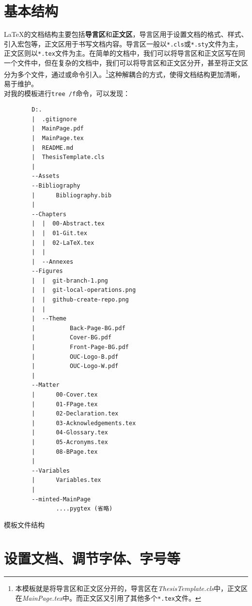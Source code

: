 \section{基本结构}

\LaTeX{}的文档结构主要包括\textbf{导言区}和\textbf{正文区}，导言区用于设置文档的格式、样式、引入宏包等，正文区用于书写文档内容。导言区一般以\texttt{*.cls}或\texttt{*.sty}文件为主，正文区则以\texttt{*.tex}文件为主。在简单的文档中，我们可以将导言区和正文区写在同一个文件中，但在复杂的文档中，我们可以将导言区和正文区分开，甚至将正文区分为多个文件，通过\verb||或\verb||命令引入。\footnote{本模板就是将导言区和正文区分开的，导言区在\textit{ThesisTemplate.cls}中，正文区在\textit{MainPage.tex}中。而正文区又引用了其他多个\texttt{*.tex}文件。}这种解耦合的方式，使得文档结构更加清晰，易于维护。\\

对我的模板进行\texttt{tree /f}命令，可以发现：

\begin{longlisting}
    \begin{verbatim}
        D:.
        |  .gitignore
        |  MainPage.pdf
        |  MainPage.tex
        |  README.md
        |  ThesisTemplate.cls
        |
        --Assets
        --Bibliography
        |      Bibliography.bib
        |
        --Chapters
        |  |  00-Abstract.tex
        |  |  01-Git.tex
        |  |  02-LaTeX.tex
        |  |
        |  --Annexes
        --Figures
        |  |  git-branch-1.png
        |  |  git-local-operations.png
        |  |  github-create-repo.png
        |  |
        |  --Theme
        |          Back-Page-BG.pdf
        |          Cover-BG.pdf
        |          Front-Page-BG.pdf
        |          OUC-Logo-B.pdf
        |          OUC-Logo-W.pdf
        |
        --Matter
        |      00-Cover.tex
        |      01-FPage.tex
        |      02-Declaration.tex
        |      03-Acknowledgements.tex
        |      04-Glossary.tex
        |      05-Acronyms.tex
        |      08-BPage.tex
        |
        --Variables
        |      Variables.tex
        |
        --minted-MainPage
               ....pygtex (省略)
    \end{verbatim}
    \caption{模板文件结构}
    \label{listing:template-structure}
\end{longlisting}

\section{设置文档、调节字体、字号等}

